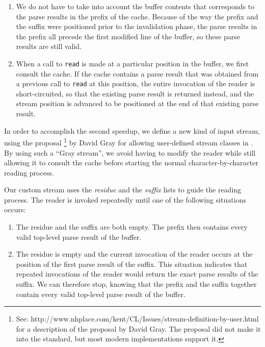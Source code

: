 \begin{enumerate}
\item We do not have to take into account the buffer contents that
  corresponds to the parse results in the prefix of the cache.
  Because of the way the prefix and the suffix were positioned prior
  to the invalidation phase, the parse results in the prefix all
  precede the first modified line of the buffer, so these parse
  results are still valid.
\item When a call to \texttt{read} is made at a particular position in
  the buffer, we first consult the cache.  If the cache contains a
  parse result that was obtained from a previous call to \texttt{read}
  at this position, the entire invocation of the reader is
  short-circuited, so that the existing parse result is returned
  instead, and the stream position is advanced to be positioned at the
  end of that existing parse result.
\end{enumerate}

In order to accomplish the second speedup, we define a new kind of
input stream, using the proposal%
\footnote{See:
  http://www.nhplace.com/kent/CL/Issues/stream-definition-by-user.html
  for a description of the proposal by David Gray.  The proposal did
  not make it into the \commonlisp{} standard, but most modern
  implementations support it.}
 by David Gray for allowing user-defined stream classes in
 \commonlisp{}.  By using such a ``Gray stream'', we avoid having to
 modify the reader while still allowing it to consult the cache before
 starting the normal character-by-character reading process.

Our custom stream uses the \emph{residue} and the \emph{suffix} lists
to guide the reading process.  The reader is invoked repeatedly until
one of the following situations occurs:

\begin{enumerate}
\item The residue and the suffix are both empty.  The prefix then
  contains every valid top-level parse result of the buffer.
\item The residue is empty and the current invocation of the reader
  occurs at the position of the first parse result of the suffix.
  This situation indicates that repeated invocations of the reader
  would return the exact parse results of the suffix.  We can
  therefore stop, knowing that the prefix and the suffix together
  contain every valid top-level parse result of the buffer.
\end{enumerate}

